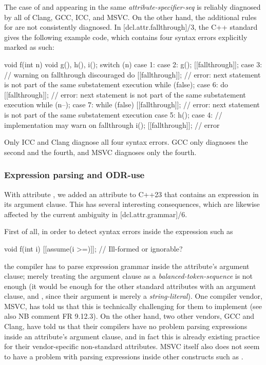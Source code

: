 The case of  and  appearing in the same \emph{attribute-specifier-seq} is reliably diagnosed by all of Clang, GCC, ICC, and MSVC. On the other hand, the additional rules for  are not consistently diagnosed. In [dcl.attr.fallthrough]/3, the C++ standard gives the following example code, which contains four syntax errors explicitly marked as such:
\begin{codeblock}
void f(int n) {
  void g(), h(), i();
  switch (n) {
  case 1:
  case 2:
    g();
    [[fallthrough]];
  case 3:                 // warning on fallthrough discouraged
    do {
      [[fallthrough]];    // error: next statement is not part of the same substatement execution
    } while (false);
  case 6:
    do {
      [[fallthrough]];    // error: next statement is not part of the same substatement execution
    } while (n--);
  case 7:
    while (false) {
      [[fallthrough]];    // error: next statement is not part of the same substatement execution
    }
  case 5:
    h();
  case 4:                 // implementation may warn on fallthrough
    i();
    [[fallthrough]];      // error
  }
}
\end{codeblock}

Only ICC and Clang diagnose all four syntax errors. GCC only diagnoses the second and the fourth, and MSVC diagnoses only the fourth.

\subsubsection{Expression parsing and ODR-use}
\label{subsubsec:odruse}

With attribute  \cite{P1774R8}, we added an attribute to C++23 that contains an expression in its argument clause. This has several interesting consequences, which are likewise affected by the current ambiguity in [dcl.attr.grammar]/6.

First of all, in order to detect syntax errors inside the expression such as
\begin{codeblock}
void f(int i) {
  [[assume(i >=)]];  // Ill-formed or ignorable?
}
\end{codeblock}
the compiler has to parse expression grammar inside the attribute's argument clause; merely treating the argument clause as a \emph{balanced-token-sequence} is not enough (it would be enough for the other standard attributes with an argument clause,  and , since their argument is merely a \emph{string-literal}). One compiler vendor, MSVC, has told us that this is technically challenging for them to implement (see also NB comment FR 9.12.3). On the other hand, two other vendors, GCC and Clang, have told us that their compilers have no problem parsing expressions inside an attribute's argument clause, and in fact this is already existing practice for their vendor-specific non-standard attributes. MSVC itself also does not seem to have a problem with parsing expressions inside other constructs such as .

